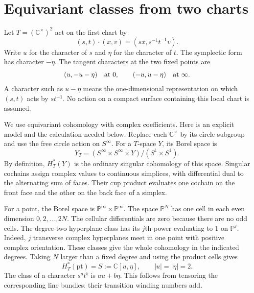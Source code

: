 \section{Equivariant classes from two charts}

Let $T=(\mathbb C^\times)^2$ act on the first chart by
\[
 (s,t)\cdot(x,v)=(s x,s^{-1}t^{-1}v).
\]
Write $u$ for the character of $s$ and $\eta$ for the character of $t$.
The symplectic form has character $-\eta$.
The tangent characters at the two fixed points are
\begin{equation}\label{eq:gi-weights}
 (u,-u-\eta)\quad\hbox{at }0,
 \qquad (-u,u-\eta)\quad\hbox{at }\infty.
\end{equation}
A character such as $u-\eta$ means the one-dimensional representation on which $(s,t)$ acts by $st^{-1}$.
No action on a compact surface containing this local chart is assumed.

We use equivariant cohomology with complex coefficients.
Here is an explicit model and the calculation needed below.
Replace each $\mathbb C^\times$ by its circle subgroup and use the free circle action on $S^\infty$.
For a $T$-space $Y$, its Borel space is
\[
 Y_T=(S^\infty\times S^\infty\times Y)/(S^1\times S^1).
\]
By definition, $H_T^*(Y)$ is the ordinary singular cohomology of this space.
Singular cochains assign complex values to continuous simplices, with differential dual to the alternating sum of faces.
Their cup product evaluates one cochain on the front face and the other on the back face of a simplex.

For a point, the Borel space is $\mathbb P^\infty\times\mathbb P^\infty$.
The space $\mathbb P^N$ has one cell in each even dimension $0,2,\ldots,2N$.
The cellular differentials are zero because there are no odd cells.
The degree-two hyperplane class has its $j$th power evaluating to $1$ on $\mathbb P^j$.
Indeed, $j$ transverse complex hyperplanes meet in one point with positive complex orientation.
These classes give the whole cohomology in the indicated degrees.
Taking $N$ larger than a fixed degree and using the product cells gives
\[
 H_T^*(\mathrm{pt})=S:=\mathbb C[u,\eta],\qquad |u|=|\eta|=2.
\]
The class of a character $s^at^b$ is $au+b\eta$.
This follows from tensoring the corresponding line bundles: their transition winding numbers add.

